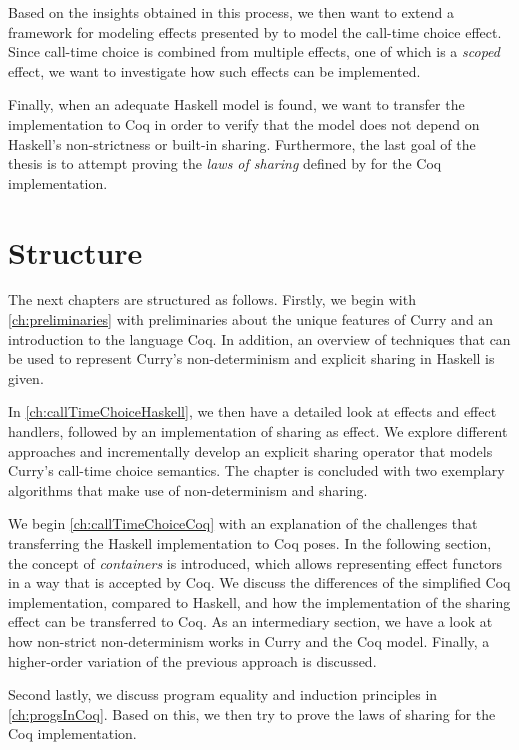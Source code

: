 \documentclass[a4paper, 11pt, fleqn, twoside, abstract=on]{scrreprt}
\begin{document}
Based on the insights obtained in this process, we then want to extend a framework for modeling effects presented by \citet{wu2014effect} to model the call-time choice effect.
Since call-time choice is combined from multiple effects, one of which is a \textit{scoped} effect, we want to investigate how such effects can be implemented.

Finally, when an adequate Haskell model is found, we want to transfer the implementation to Coq in order to verify that the model does not depend on Haskell's non-strictness or built-in sharing.
Furthermore, the last goal of the thesis is to attempt proving the \textit{laws of sharing} defined by \citet{fischer2009purely} for the Coq implementation.

\section{Structure}

The next chapters are structured as follows.
Firstly, we begin with \autoref{ch:preliminaries} with preliminaries about the unique features of Curry and an introduction to the language Coq.
In addition, an overview of techniques that can be used to represent Curry's non-determinism and explicit sharing in Haskell is given.

In \autoref{ch:callTimeChoiceHaskell}, we then have a detailed look at effects and effect handlers, followed by an implementation of sharing as effect.
We explore different approaches and incrementally develop an explicit sharing operator that models Curry's call-time choice semantics.
The chapter is concluded with two exemplary algorithms that make use of non-determinism and sharing.

We begin \autoref{ch:callTimeChoiceCoq} with an explanation of the challenges that transferring the Haskell implementation to Coq poses.
In the following section, the concept of \textit{containers} is introduced, which allows representing effect functors in a way that is accepted by Coq.
We discuss the differences of the simplified Coq implementation, compared to Haskell, and how the implementation of the sharing effect can be transferred to Coq.
As an intermediary section, we have a look at how non-strict non-determinism works in Curry and the Coq model.
Finally, a higher-order variation of the previous approach is discussed.

Second lastly, we discuss program equality and induction principles in  \autoref{ch:progsInCoq}.
Based on this, we then try to prove the laws of sharing for the Coq implementation.
\end{document}
